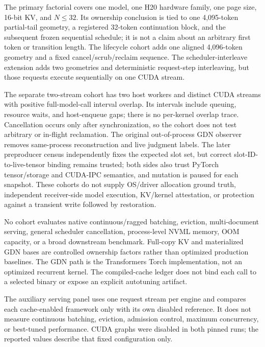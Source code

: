 \documentclass{article}
\begin{document}
The primary factorial covers one model, one H20 hardware family, one page
size, 16-bit KV, and $N\leq32$.  Its ownership conclusion is tied to one
4,095-token partial-tail geometry, a registered 32-token continuation block,
and the subsequent frozen sequential schedule; it is not a claim about an
arbitrary first token or transition length.  The lifecycle cohort adds one
aligned 4,096-token geometry and a fixed cancel/scrub/reclaim sequence.  The
scheduler-interleave extension adds two geometries and deterministic
request-step interleaving, but those requests execute sequentially on one CUDA
stream.

The separate two-stream cohort has two host workers and distinct CUDA streams
with positive full-model-call interval overlap.  Its intervals include
queuing, resource waits, and host-enqueue gaps; there is no per-kernel overlap
trace.  Cancellation occurs only after synchronization, so the cohort does not
test arbitrary or in-flight reclamation.  The original out-of-process GDN
observer removes same-process reconstruction and live judgment labels.  The
later preproducer census independently fixes the expected slot set, but correct
slot-ID-to-live-tensor binding remains trusted; both sides also trust PyTorch
tensor/storage and CUDA-IPC semantics, and mutation is paused for each snapshot.
These cohorts do not supply OS/driver allocation ground truth, independent
receiver-side model execution, KV/kernel attestation, or protection against a
transient write followed by restoration.

No cohort evaluates native continuous/ragged batching, eviction,
multi-document serving, general scheduler cancellation, process-level NVML
memory, OOM capacity, or a broad downstream benchmark.  Full-copy KV and
materialized GDN bases are controlled ownership factors rather than optimized
production baselines.  The GDN path is the Transformers Torch implementation,
not an optimized recurrent kernel.  The compiled-cache ledger does not bind
each call to a selected binary or expose an explicit autotuning artifact.

The auxiliary serving panel uses one request stream per engine and compares
each cache-enabled framework only with its own disabled reference.  It does not
measure continuous batching, eviction, admission control, maximum concurrency,
or best-tuned performance.  CUDA graphs were disabled in both pinned runs; the
reported values describe that fixed configuration only.
\end{document}
